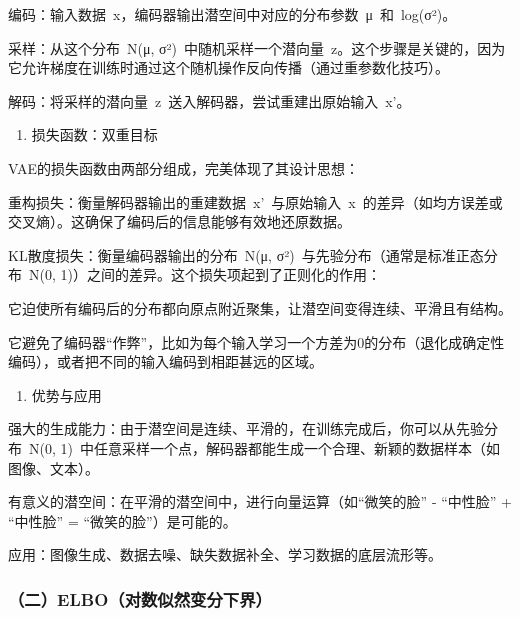 编码：输入数据~x，编码器输出潜空间中对应的分布参数~μ~和~log(σ²)。

采样：从这个分布~N(μ, σ²)~中随机采样一个潜向量~z。这个步骤是关键的，因为它允许梯度在训练时通过这个随机操作反向传播（通过重参数化技巧）。

解码：将采样的潜向量~z~送入解码器，尝试重建出原始输入~x'。

\begin{enumerate}
\def\labelenumi{\arabic{enumi}.}
\setcounter{enumi}{2}
\tightlist
\item
  损失函数：双重目标
\end{enumerate}

VAE的损失函数由两部分组成，完美体现了其设计思想：

重构损失：衡量解码器输出的重建数据~x'~与原始输入~x~的差异（如均方误差或交叉熵）。这确保了编码后的信息能够有效地还原数据。

KL散度损失：衡量编码器输出的分布~N(μ, σ²)~与先验分布（通常是标准正态分布~N(0, 1)）之间的差异。这个损失项起到了正则化的作用：

它迫使所有编码后的分布都向原点附近聚集，让潜空间变得连续、平滑且有结构。

它避免了编码器``作弊''，比如为每个输入学习一个方差为0的分布（退化成确定性编码），或者把不同的输入编码到相距甚远的区域。

\begin{enumerate}
\def\labelenumi{\arabic{enumi}.}
\setcounter{enumi}{3}
\tightlist
\item
  优势与应用
\end{enumerate}

强大的生成能力：由于潜空间是连续、平滑的，在训练完成后，你可以从先验分布~N(0, 1)~中任意采样一个点，解码器都能生成一个合理、新颖的数据样本（如图像、文本）。

有意义的潜空间：在平滑的潜空间中，进行向量运算（如``微笑的脸'' - ``中性脸'' + ``中性脸'' = ``微笑的脸''）是可能的。

应用：图像生成、数据去噪、缺失数据补全、学习数据的底层流形等。

\hypertarget{ux4e8celboux5bf9ux6570ux4f3cux7136ux53d8ux5206ux4e0bux754c}{%
\subsubsection{（二）ELBO（对数似然变分下界）}\label{ux4e8celboux5bf9ux6570ux4f3cux7136ux53d8ux5206ux4e0bux754c}}

